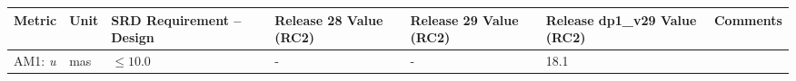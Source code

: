\begin{longtable}[]{@{}lllllll@{}}
\toprule
\begin{minipage}[b]{0.12\columnwidth}\raggedright\strut
Metric\strut
\end{minipage} & \begin{minipage}[b]{0.06\columnwidth}\raggedright\strut
Unit\strut
\end{minipage} & \begin{minipage}[b]{0.14\columnwidth}\raggedright\strut
SRD Requirement -- Design\strut
\end{minipage} & \begin{minipage}[b]{0.12\columnwidth}\raggedright\strut
Release 28 Value (RC2) \strut
\end{minipage} & \begin{minipage}[b]{0.12\columnwidth}\raggedright\strut
Release 29 Value (RC2) \strut
\end{minipage} & \begin{minipage}[b]{0.12\columnwidth}\raggedright\strut
Release dp1\_v29 Value (RC2) \strut
\end{minipage} & \begin{minipage}[b]{0.17\columnwidth}\raggedright\strut
Comments\strut
\end{minipage}\tabularnewline
\midrule
\endhead
\begin{minipage}[t]{0.12\columnwidth}\raggedright\strut
AM1: \emph{u}\strut
\end{minipage} & \begin{minipage}[t]{0.06\columnwidth}\raggedright\strut
mas\strut
\end{minipage} & \begin{minipage}[t]{0.14\columnwidth}\raggedright\strut
\(\leq 10.0\)\strut
\end{minipage} & \begin{minipage}[t]{0.12\columnwidth}\raggedright\strut
- \strut
\end{minipage} & \begin{minipage}[t]{0.12\columnwidth}\raggedright\strut
- \strut
\end{minipage} & \begin{minipage}[t]{0.12\columnwidth}\raggedright\strut
18.1 \strut
\end{minipage} & \begin{minipage}[t]{0.17\columnwidth}\raggedright\strut


\end{minipage}
\end{longtable}
